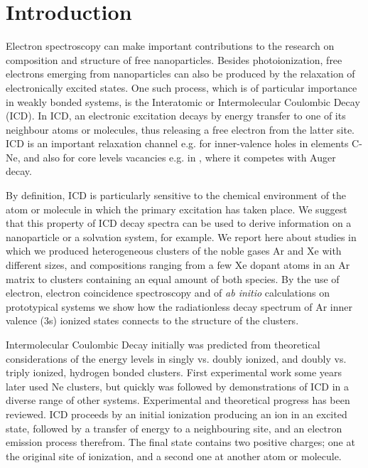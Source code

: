 \section{Introduction}
%
Electron spectroscopy can make important contributions to the 
research on composition and structure of free nanoparticles.\cite{
jpcc} Besides photoionization, free electrons emerging from 
nanoparticles can also be produced by the relaxation of 
electronically excited states. One such process, which is of 
particular importance in weakly bonded systems, is the 
Interatomic or Intermolecular Coulombic Decay (ICD).\cite{
cederbaum} In ICD, an electronic excitation decays by energy 
transfer to one of its neighbour atoms or molecules, thus 
releasing a free electron from the latter site. ICD is an 
important relaxation channel e.g. for inner-valence holes in 
elements C-Ne, and also for core levels vacancies e.g. in 
, where it competes with Auger decay.\cite{slavicek}

By definition, ICD is particularly sensitive to the chemical 
environment of the atom or molecule in which the primary 
excitation has taken place. We suggest that this property of ICD 
decay spectra can be used to derive information on a nanoparticle 
or a solvation system, for example. We report here about studies 
in which we produced heterogeneous clusters of the noble gases Ar 
and Xe with different sizes, and compositions ranging from a few 
Xe dopant atoms in an Ar matrix to clusters containing an equal 
amount of both species. By the use of electron, electron 
coincidence spectroscopy and of {\it ab initio} calculations on 
prototypical systems we show how the radiationless decay spectrum 
of Ar inner valence (3s) ionized states connects to the structure 
of the clusters.

Intermolecular Coulombic Decay initially was predicted from 
theoretical considerations of the energy levels in singly vs. 
doubly ionized, and doubly vs. triply ionized, hydrogen bonded 
clusters.\cite{cederbaum} First experimental work some years 
later used Ne clusters,\cite{marburger,jahnkenedimer} but quickly 
was followed by demonstrations of ICD in a diverse range of other 
systems. Experimental and theoretical progress has been reviewed.
\cite{hergenhahn_review, averbukh_review, jahnke_review} ICD 
proceeds by an initial ionization producing an ion in an excited 
state, followed by a transfer of energy to a neighbouring site, 
and an electron emission process therefrom. The final state contains 
two positive charges; one at the original site of ionization, and a second
one at another atom or molecule. 

